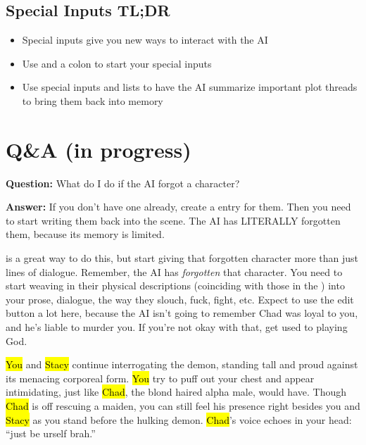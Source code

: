 \documentclass[Avsfag-main.tex]{subfiles}
\begin{document}
\section{Special Inputs TL;DR}

\begin{itemize}
\item
  Special inputs give you new ways to interact with the AI
\item
  Use \story and a colon to start your special inputs
\item
  Use special inputs and lists to have the AI summarize important plot
  threads to bring them back into memory
\end{itemize}

\chapter{Q\&A (in progress)}
\label{ch:qa}

\hspace{\parindent}\textbf{Question:} What do I do if the AI forgot a character?

\textbf{Answer:} If you don't have one already, create a
 entry for them.
Then you need to start writing them back into the scene. The AI has
LITERALLY forgotten them, because its memory is limited.

\story is a great way to do this, but start giving that forgotten character more than just lines of dialogue.
Remember, the AI has \emph{forgotten} that character.
You need to start weaving in their physical descriptions (coinciding with those in the \wi) into your prose, dialogue, the way they slouch, fuck, fight, etc.
Expect to use the edit button a lot here, because the AI isn't going to remember Chad was loyal to you, and he's liable to murder you.
If you're not okay with that, get used to playing God.

\begin{storyb}
	\story \hl{You} and \hl{Stacy} continue interrogating the demon, standing tall and proud against its menacing corporeal form.
	\hl{You} try to puff out your chest and appear intimidating, just like \hl{Chad}, the blond haired alpha male, would have.
	Though \hl{Chad} is off rescuing a maiden, you can still feel his presence right besides you and \hl{Stacy} as you stand before the hulking demon.
	\hl{Chad}'s voice echoes in your head: ``just be urself brah.''
\end{storyb}\smallskip
\end{document}
